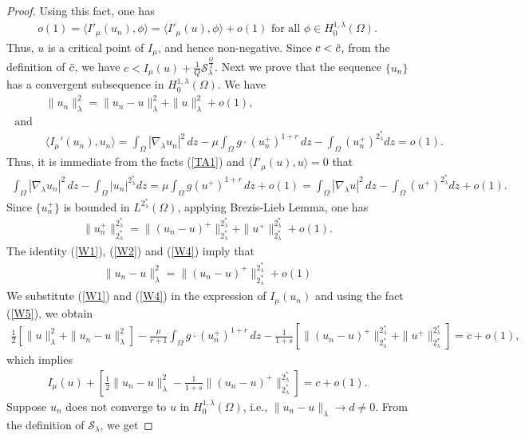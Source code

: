 \documentclass[10pt,a4paper]{amsart}
\begin{document}
\begin{proof}
 Using this fact, one has
\begin{align}\label{W3}
    o(1)=\langle I'_\mu(u_n),\phi\rangle=\langle I'_\mu(u),\phi\rangle+o(1) \text{ for all }\phi\in H^{1,\lambda}_0(\Omega).
\end{align}
Thus, $u$ is a critical point of $I_\mu$, and hence non-negative. Since $c<\Tilde{c}$, from the definition of $\Tilde{c}$, we have $c<I_\mu(u)+\frac{1}{Q}\mathcal{S}_\lambda^\frac{Q}{2}$. Next we prove that the sequence $\{u_n\}$ has a convergent subsequence in $H^{1,\lambda}_0(\Omega)$. We have
\begin{align}
    &\|u_n\|_\lambda^2=\|u_n-u\|_\lambda^2+\|u\|_\lambda^2+o(1)\label{W1},\\
    \text{ and }&\nonumber\\
    &\langle I_\mu'(u_n),u_n\rangle=\int_\Omega |\nabla_\lambda u_n|^2\, dz-\mu\int_\Omega g\cdot(u_n^+)^{1+r} \, dz-\int_\Omega(u_n^+)^{2^*_\lambda} dz=o(1).\label{TA1}
\end{align}
Thus, it is immediate from the facts (\ref{TA1}) and $\langle I'_\mu(u),u\rangle=0$ that
\begin{align}\label{W2}
    \int_\Omega |\nabla_\lambda u_n|^2\, dz-\int_\Omega|u_n|^{2^*_\lambda} dz=\mu\int_\Omega g(u^+)^{1+r} \, dz + o(1)=\int_\Omega |\nabla_\lambda u|^2\, dz-\int_\Omega(u^+)^{2^*_\lambda} dz+o(1).
\end{align}
Since $\{u_n^+\}$ is bounded in $L^{2^*_\lambda}(\Omega)$, applying Brezis-Lieb Lemma, one has 
\begin{align}\label{W4}
  \|u_n^+\|_{2^*_\lambda}^{2^*_\lambda} = \|(u_n-u)^+\|_{2^*_\lambda}^{2^*_\lambda}+\|u^+\|_{2^*_\lambda}^{2^*_\lambda}+o(1).
\end{align}
The identity (\ref{W1}), (\ref{W2}) and (\ref{W4}) imply that
\begin{align}\label{W8}
    \|u_n-u\|_\lambda^2=\|(u_n-u)^+\|_{2^*_\lambda}^{2^*_\lambda}+o(1)
\end{align}
We substitute (\ref{W1}) and (\ref{W4}) in the expression of $I_\mu(u_n)$ and using the fact (\ref{W5}), we obtain 
\begin{align*}
    \frac{1}{2}\left [\|u\|_\lambda^2+\|u_n-u\|_\lambda^2 \right ]-\frac{\mu}{r+1}\int_\Omega g\cdot(u_n^+)^{1+r}\, dz-\frac{1}{1+s}\left [\|(u_n-u)^+\|_{2^*_\lambda}^{2^*_\lambda}+\|u^+\|_{2^*_\lambda}^{2^*_\lambda}\right ]=c+o(1),
\end{align*}
which implies
\begin{align}\label{W9}
    I_\mu(u)+\left [\frac{1}{2}\|u_n-u\|_\lambda^2-\frac{1}{1+s} \|(u_n-u)^+\|_{2^*_\lambda}^{2^*_\lambda} \right ]=c+o(1).
\end{align}
Suppose $u_n$ does not converge to $u$ in $H^{1,\lambda}_0(\Omega)$, i.e., $\|u_n-u\|_\lambda\to d\neq 0$. From the definition of $\mathcal{S}_\lambda$, we get


\end{proof}
\end{document}
